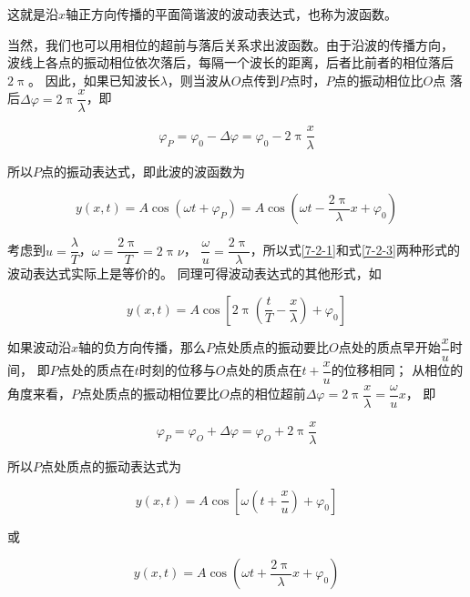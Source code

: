 \documentclass[
	12pt, %
	a4paper, %
]{myLegrandOrangeBook}
\begin{document}
    这就是沿\(x\)轴正方向传播的平面简谐波的波动表达式，也称为波函数。
    
    当然，我们也可以用相位的超前与落后关系求出波函数。由于沿波的传播方向，
    波线上各点的振动相位依次落后，每隔一个波长的距离，后者比前者的相位落后\(2 \uppi \)。
    因此，如果已知波长\(\lambda\)，则当波从\(O \)点传到\(P\)点时，\(P \)点的振动相位比\(O\)点
    落后\(\Delta \varphi = 2\uppi \dfrac{x}{\lambda}\)，即

    \begin{equation}
        \varphi_P=\varphi_0-\Delta \varphi=\varphi_0-2 \uppi \frac{x}{\lambda}
    \end{equation}

    所以\(P \)点的振动表达式，即此波的波函数为

    \begin{equation}
        y(x, t)=A \cos \left(\omega t+\varphi_P\right)=A \cos \left(\omega t-\frac{2 \uppi}{\lambda} x+\varphi_0\right)
        \label{7-2-3}
    \end{equation}

    考虑到\(u = \dfrac{\lambda }{T }\)，\(\omega = \dfrac{2 \uppi}{T } = 2 \uppi \nu\)，
    \(\dfrac{\omega}{u}=\dfrac{2 \uppi}{\lambda}\)，所以式\ref{7-2-1}和式\ref{7-2-3}两种形式的波动表达式实际上是等价的。
    同理可得波动表达式的其他形式，如

    \begin{equation}
        y(x, t)=A \cos \left[2 \uppi\left(\frac{t}{T}-\frac{x}{\lambda}\right)+\varphi_0\right]
    \end{equation}

    如果波动沿\(x \)轴的负方向传播，那么\(P \)点处质点的振动要比\(O \)点处的质点早开始\(\dfrac{x }{u }\)时间，
    即\(P\)点处的质点在\(t\)时刻的位移与\(O\)点处的质点在\(t + \dfrac{x }{u }\)的位移相同；
    从相位的角度来看，\(P \)点处质点的振动相位要比\(O \)点的相位超前$\Delta \varphi=2 \uppi \dfrac{x}{\lambda}=\dfrac{\omega}{u} x$，
    即

    $$
        \varphi_P=\varphi_O+\Delta \varphi=\varphi_O+2 \uppi \frac{x}{\lambda}
    $$

    所以\(P \)点处质点的振动表达式为

    \begin{equation}
        y(x, t)=A \cos \left[\omega\left(t+\frac{x}{u}\right)+\varphi_0\right]
    \end{equation}
    
    或

    \begin{equation}
        y(x, t)=A \cos \left(\omega t+\frac{2 \uppi}{\lambda} x+\varphi_0\right)
    \end{equation}
\end{document}
